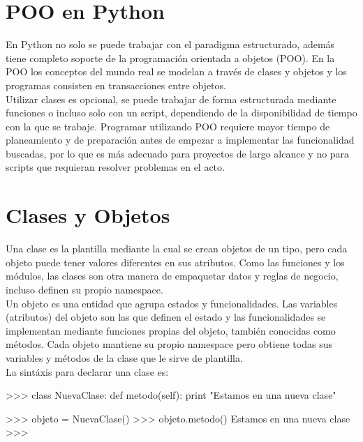 \section{POO en Python}

En Python no solo se puede trabajar con el paradigma estructurado, además tiene completo soporte de la programación orientada a objetos (POO). En la POO los conceptos del mundo real se modelan a través de clases y objetos y los programas consisten en transacciones entre objetos.\\

Utilizar clases es opcional, se puede trabajar de forma estructurada mediante funciones o incluso solo con un script, dependiendo de la disponibilidad de tiempo con la que se trabaje. Programar utilizando POO requiere mayor tiempo de planeamiento y de preparación antes de empezar a implementar las funcionalidad buscadas, por lo que es más adecuado para proyectos de largo alcance y no para scripts que requieran resolver problemas en el acto.

\section{Clases y Objetos}

Una clase es la plantilla mediante la cual se crean objetos de un tipo, pero cada objeto puede tener valores diferentes en sus atributos. Como las funciones y los módulos, las clases son otra manera de empaquetar datos y reglas de negocio, incluso definen su propio namespace.\\

Un objeto es una entidad que agrupa estados y funcionalidades. Las variables (atributos) del objeto son las que definen el estado y las funcionalidades se implementan mediante funciones propias del objeto, también conocidas como métodos. Cada objeto mantiene su propio namespace pero obtiene todas sus variables y métodos de la clase que le sirve de plantilla.\\

La sintáxis para declarar una clase es:\\

\begin{pyglist} [language=python]
>>> class NuevaClase:
        def metodo(self):
            print "Estamos en una nueva clase"
 
>>> objeto = NuevaClase()
>>> objeto.metodo()
Estamos en una nueva clase
>>>
\end{pyglist}

